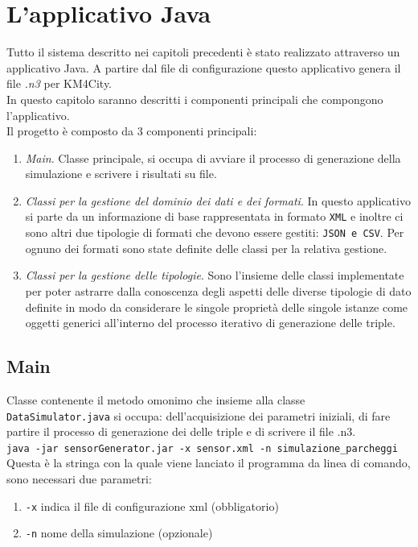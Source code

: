 \documentclass[12pt,a4paper,italian]{article}
\begin{document}
\section{L'applicativo Java}
Tutto il sistema descritto nei capitoli precedenti è stato realizzato attraverso un applicativo Java. A partire dal file di configurazione questo applicativo genera il file \emph{.n3} per KM4City.\\ In questo capitolo saranno descritti i componenti principali che  compongono l'applicativo.\\
\newline
Il progetto è composto da 3 componenti principali:\\
\begin{enumerate}
	\item \emph{Main}. Classe principale, si occupa di avviare il processo di generazione della simulazione e scrivere i risultati su file.
	\item \emph{Classi per la gestione del dominio dei dati e dei formati}. In questo applicativo si parte da un informazione di base rappresentata in formato \texttt{XML} e inoltre ci sono altri due tipologie di formati che devono essere gestiti: \texttt{JSON e CSV}. Per ognuno dei formati sono state definite delle classi per la relativa gestione. 
	\item \emph{Classi per la gestione delle tipologie}. Sono l'insieme delle classi implementate per poter astrarre dalla conoscenza degli aspetti delle diverse tipologie di dato definite in modo da considerare le singole proprietà delle singole istanze come oggetti generici all'interno del processo iterativo di generazione delle triple.
\end{enumerate}
	\subsection{Main}
	Classe contenente il metodo omonimo che insieme alla classe \texttt{DataSimulator.java} si occupa: dell'acquisizione dei parametri iniziali, di fare partire il processo di generazione dei delle triple e di scrivere il file {.n3}. \\
	
	\texttt{java -jar sensorGenerator.jar -x sensor.xml -n simulazione\_parcheggi} \\
	
	Questa è la stringa con la quale viene lanciato il programma da linea di comando, sono necessari due parametri:\\
	\begin{enumerate}
		\item \texttt{-x} indica il file di configurazione xml (obbligatorio)
		\item \texttt{-n} nome della simulazione (opzionale)
	\end{enumerate}  
	
\end{document}
